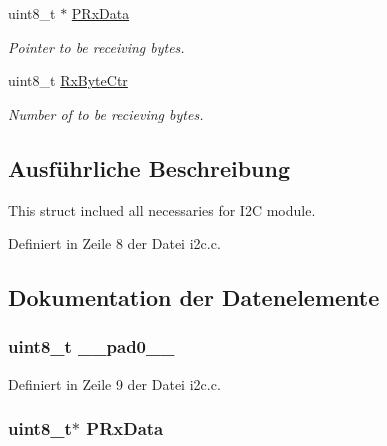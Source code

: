 \begin{DoxyCompactItemize}
uint8\+\_\+t $\ast$ \hyperlink{struct_i2_c___c_t_r_l_a3c8ed69cf31f6ee7aa513fe5f115ba92}{P\+Rx\+Data}
\begin{DoxyCompactList}\small\item\em Pointer to be receiving bytes. \end{DoxyCompactList}\item 
uint8\+\_\+t \hyperlink{struct_i2_c___c_t_r_l_a37e493c5b47477e45136924079fd9606}{Rx\+Byte\+Ctr}
\begin{DoxyCompactList}\small\item\em Number of to be recieving bytes. \end{DoxyCompactList}\end{DoxyCompactItemize}


\subsection{Ausführliche Beschreibung}
This struct inclued all necessaries for I2\+C module. 

Definiert in Zeile 8 der Datei i2c.\+c.



\subsection{Dokumentation der Datenelemente}
\hypertarget{struct_i2_c___c_t_r_l_a8b4eebe79ded0459acec2f4950102ba3}{}
\subsubsection[{\+\_\+\+\_\+pad0\+\_\+\+\_\+}]{\setlength{\rightskip}{0pt plus 5cm}uint8\+\_\+t \+\_\+\+\_\+pad0\+\_\+\+\_\+}\label{struct_i2_c___c_t_r_l_a8b4eebe79ded0459acec2f4950102ba3}


Definiert in Zeile 9 der Datei i2c.\+c.

\hypertarget{struct_i2_c___c_t_r_l_a3c8ed69cf31f6ee7aa513fe5f115ba92}{}
\subsubsection[{P\+Rx\+Data}]{\setlength{\rightskip}{0pt plus 5cm}uint8\+\_\+t$\ast$ P\+Rx\+Data}\label{struct_i2_c___c_t_r_l_a3c8ed69cf31f6ee7aa513fe5f115ba92}


